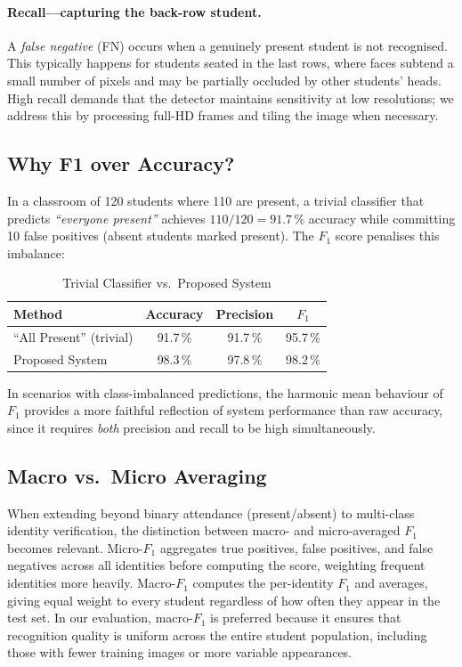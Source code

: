 \documentclass[conference, 10pt]{IEEEtran}
\begin{document}
\paragraph{Recall---capturing the back-row student.}
A \emph{false negative} (FN) occurs when a genuinely present student is not recognised.  This
typically happens for students seated in the last rows, where faces subtend a small number of
pixels and may be partially occluded by other students' heads.  High recall demands that the
detector maintains sensitivity at low resolutions; we address this by processing full-HD frames
and tiling the image when necessary.

\subsection{Why F1 over Accuracy?}

In a classroom of 120 students where 110 are present, a trivial classifier that predicts
\emph{``everyone present''} achieves $110 / 120 = 91.7\,\%$ accuracy while committing 10 false
positives (absent students marked present).  The $F_1$ score penalises this imbalance:

\begin{table}[htbp]
\centering
\caption{Trivial Classifier vs.\ Proposed System}
\label{tab:f1_comparison}
\begin{tabular}{lccc}
\toprule
\textbf{Method} & \textbf{Accuracy} & \textbf{Precision} & \textbf{$F_1$} \\
\midrule
``All Present'' (trivial) & 91.7\,\% & 91.7\,\% & 95.7\,\% \\
Proposed System           & 98.3\,\% & 97.8\,\% & 98.2\,\% \\
\bottomrule
\end{tabular}
\end{table}

In scenarios with class-imbalanced predictions, the harmonic mean behaviour of $F_1$ provides a
more faithful reflection of system performance than raw accuracy, since it requires
\emph{both} precision and recall to be high simultaneously.

\subsection{Macro vs.\ Micro Averaging}

When extending beyond binary attendance (present/absent) to multi-class identity verification,
the distinction between macro- and micro-averaged $F_1$ becomes relevant.  Micro-$F_1$
aggregates true positives, false positives, and false negatives across all identities before
computing the score, weighting frequent identities more heavily.  Macro-$F_1$ computes the
per-identity $F_1$ and averages, giving equal weight to every student regardless of how often
they appear in the test set.  In our evaluation, macro-$F_1$ is preferred because it ensures
that recognition quality is uniform across the entire student population, including those with
fewer training images or more variable appearances.
\end{document}
